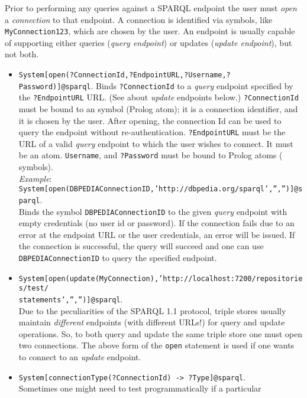 Prior to performing any queries against a SPARQL endpoint the user must
\emph{open} a \emph{connection} to that endpoint.
A connection is identified via \ERGO symbols, like \texttt{MyConnection123},
which are chosen by the user.
An endpoint is usually capable of supporting either queries (\emph{query
endpoint})   or updates (\emph{update endpoint}), but not both.  
\begin{itemize}
\item
  \texttt{System[open(?ConnectionId,?EndpointURL,?Username,?Password)]@\bs{}sparql}.
  Binds \texttt{?ConnectionId} to a \emph{query} endpoint specified by the
  \texttt{?EndpointURL} URL.  (See about \emph{update} endpoints
  below.) 
  \texttt{?ConnectionId}  must be bound to an \ERGO symbol (Prolog atom);
  it is a connection identifier, and it is chosen by the user.
  After opening, the connection Id
  can be used to query the endpoint without re-authentication.
  \texttt{?EndpointURL} must be the URL of a valid \emph{query}
  endpoint to which the user wishes
  to connect. It must be an atom.
  \texttt{Username}, and 
  \texttt{?Password}  must be bound to Prolog atoms (\ERGO
  symbols).  
  \\
  \emph{Example}:\\
  \texttt{System[open(DBPEDIAConnectionID,'http://dbpedia.org/sparql','','')]@\bs{}sparql}. 
  \\
  Binds the symbol \texttt{DBPEDIAConnectionID}  to the given
  \emph{query} endpoint
  with empty credentials (no user id or password). 
  If the connection fails due to an error at the endpoint URL or the user 
  credentials, an error will be issued.
  If the connection is successful, the query will succeed and one can use
  \texttt{DBPEDIAConnectionID} to query the specified endpoint.
\item
  \texttt{System[open(update(MyConnection),'http://localhost:7200/repositories/test/\\statements','','')]@\bs{}sparql}.
  \\
  Due to the peculiarities of the SPARQL 1.1 protocol, triple stores
  usually maintain \emph{different} endpoints (with different URLs!) for
  query and update operations. So, to both query and update the same triple
  store one must open two connections. The above form of the \texttt{open} 
  statement is used if one wants to connect to an \emph{update}
  endpoint.
\item \texttt{System[connectionType(?ConnectionId) -> ?Type]@\bs{}sparql}.\\
  Sometimes one might need to test programmatically if a particular

\end{itemize}
